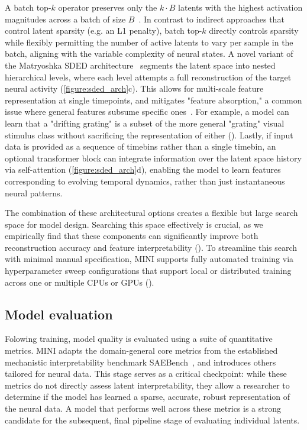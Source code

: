 A batch top-$k$ operator preserves only the $k \cdot B$ latents with the highest activation magnitudes across a batch of size $B$~\cite{bussmann_2024_batchtopk}. In contrast to indirect approaches that control latent sparsity (e.g. an L1 penalty), batch top-$k$ directly controls sparsity while flexibly permitting the number of active latents to vary per sample in the batch, aligning with the variable complexity of neural states. A novel variant of the Matryoshka SDED architecture~\cite{bussmann_2025_msae} segments the latent space into nested hierarchical levels, where each level attempts a full reconstruction of the target neural activity (\autoref{figure:sded_arch}c). This allows for multi-scale feature representation at single timepoints, and mitigates "feature absorption," a common issue where general features subsume specific ones~\cite{chanin_2024_feature_absorption}. For example, a model can learn that a "drifting grating" is a subset of the more general "grating" visual stimulus class without sacrificing the representation of either (). Lastly, if input data is provided as a sequence of timebins rather than a single timebin, an optional transformer block can integrate information over the latent space history via self-attention (\autoref{figure:sded_arch}d), enabling the model to learn features corresponding to evolving temporal dynamics, rather than just instantaneous neural patterns. 

The combination of these architectural options creates a flexible but large search space for model design. Searching this space effectively is crucial, as we empirically find that these components can significantly improve both reconstruction accuracy and feature interpretability (). To streamline this search with minimal manual specification, MINI supports fully automated training via hyperparameter sweep configurations that support local or distributed training across one or multiple CPUs or GPUs ().

\subsection{Model evaluation}

Folowing training, model quality is evaluated using a suite of quantitative metrics. MINI adapts the domain-general core metrics from the established mechanistic interpretability benchmark SAEBench~\cite{karvonen_2025_saebench}, and introduces others tailored for neural data. This stage serves as a critical checkpoint: while these metrics do not directly assess latent interpretability, they allow a researcher to determine if the model has learned a sparse, accurate, robust representation of the neural data. A model that performs well across these metrics is a strong candidate for the subsequent, final pipeline stage of evaluating individual latents.

